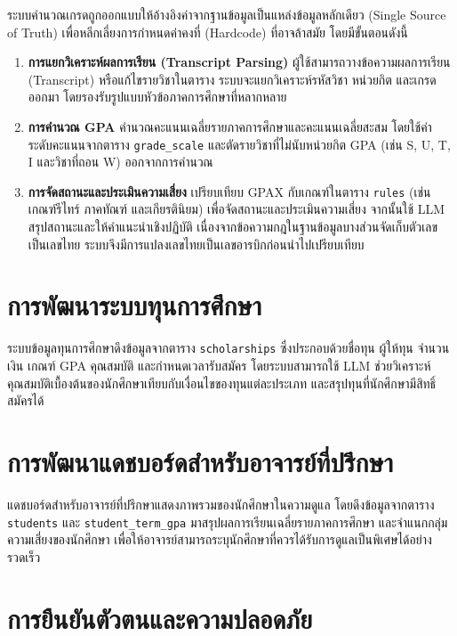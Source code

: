 ระบบคำนวณเกรดถูกออกแบบให้อ้างอิงค่าจากฐานข้อมูลเป็นแหล่งข้อมูลหลักเดียว (Single Source of Truth) เพื่อหลีกเลี่ยงการกำหนดค่าคงที่ (Hardcode) ที่อาจล้าสมัย โดยมีขั้นตอนดังนี้

\begin{enumerate}
    \item \textbf{การแยกวิเคราะห์ผลการเรียน (Transcript Parsing)} ผู้ใช้สามารถวางข้อความผลการเรียน (Transcript) หรือแก้ไขรายวิชาในตาราง ระบบจะแยกวิเคราะห์รหัสวิชา หน่วยกิต และเกรดออกมา โดยรองรับรูปแบบหัวข้อภาคการศึกษาที่หลากหลาย
    \item \textbf{การคำนวณ GPA} คำนวณคะแนนเฉลี่ยรายภาคการศึกษาและคะแนนเฉลี่ยสะสม โดยใช้ค่าระดับคะแนนจากตาราง \texttt{grade\_scale} และตัดรายวิชาที่ไม่นับหน่วยกิต GPA (เช่น S, U, T, I และวิชาที่ถอน W) ออกจากการคำนวณ
    \item \textbf{การจัดสถานะและประเมินความเสี่ยง} เปรียบเทียบ GPAX กับเกณฑ์ในตาราง \texttt{rules} (เช่น เกณฑ์รีไทร์ ภาคทัณฑ์ และเกียรตินิยม) เพื่อจัดสถานะและประเมินความเสี่ยง จากนั้นใช้ LLM สรุปสถานะและให้คำแนะนำเชิงปฏิบัติ เนื่องจากข้อความกฎในฐานข้อมูลบางส่วนจัดเก็บตัวเลขเป็นเลขไทย ระบบจึงมีการแปลงเลขไทยเป็นเลขอารบิกก่อนนำไปเปรียบเทียบ
\end{enumerate}

\section{การพัฒนาระบบทุนการศึกษา}

ระบบข้อมูลทุนการศึกษาดึงข้อมูลจากตาราง \texttt{scholarships} ซึ่งประกอบด้วยชื่อทุน ผู้ให้ทุน จำนวนเงิน เกณฑ์ GPA คุณสมบัติ และกำหนดเวลารับสมัคร โดยระบบสามารถใช้ LLM ช่วยวิเคราะห์คุณสมบัติเบื้องต้นของนักศึกษาเทียบกับเงื่อนไขของทุนแต่ละประเภท และสรุปทุนที่นักศึกษามีสิทธิ์สมัครได้

\section{การพัฒนาแดชบอร์ดสำหรับอาจารย์ที่ปรึกษา}

แดชบอร์ดสำหรับอาจารย์ที่ปรึกษาแสดงภาพรวมของนักศึกษาในความดูแล โดยดึงข้อมูลจากตาราง \texttt{students} และ \texttt{student\_term\_gpa} มาสรุปผลการเรียนเฉลี่ยรายภาคการศึกษา และจำแนกกลุ่มความเสี่ยงของนักศึกษา เพื่อให้อาจารย์สามารถระบุนักศึกษาที่ควรได้รับการดูแลเป็นพิเศษได้อย่างรวดเร็ว

\section{การยืนยันตัวตนและความปลอดภัย}

